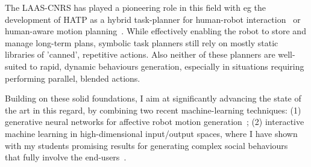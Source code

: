 The LAAS-CNRS has played a pioneering role in this field with eg the development
of HATP as a hybrid task-planner for human-robot
interaction~\cite{Alili2008,Lallement2014} or human-aware motion
planning~\cite{gharbi2013natural, waldhart2015planning}. While effectively
enabling the robot to store and manage long-term plans, symbolic task planners
still rely on mostly static libraries of 'canned', repetitive actions. Also
neither of these planners are well-suited to rapid, dynamic behaviours
generation, especially in situations requiring performing parallel, blended
actions.

Building on these solid foundations, I aim at significantly advancing the state
of the art in this regard, by combining two recent machine-learning techniques:
(1) generative neural networks for affective robot motion
generation~\parencite{yang2019appgan,marmpena2019generating,suguitan2020moveae};
(2) interactive machine learning in high-dimensional input/output spaces, where
I have shown with my students promising results for generating complex social
behaviours~\parencite{senft2019teaching, winkle2020insitu} that fully involve
the end-users~\parencite{winkle2018social}.

